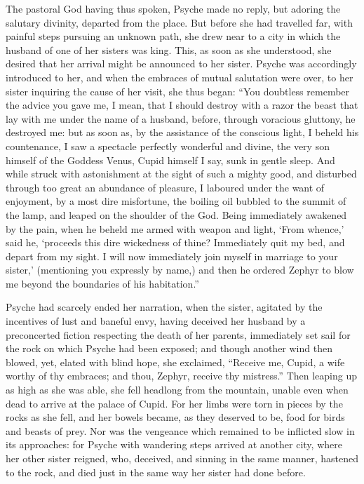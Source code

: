 \documentclass{article}
\begin{document}
The pastoral God having thus spoken, Psyche made no reply, but adoring the
salutary divinity, departed from the place. But before she had travelled far,
with painful steps pursuing an unknown path, she drew near to a city in which
the husband of one of her sisters was king. This, as soon as she understood,
she desired that her arrival might be announced to her sister. Psyche was
accordingly introduced to her, and when the embraces of mutual salutation were
over, to her sister inquiring the cause of her visit, she thus began: ``You
doubtless remember the advice you gave me, I mean, that I should destroy with a
razor the beast that lay with me under the name of a husband, before, through
voracious gluttony, he destroyed me: but as soon as, by the assistance of the
conscious light, I beheld his countenance, I saw a spectacle perfectly
wonderful and divine, the very son himself of the Goddess Venus, Cupid himself
I say, sunk in gentle sleep. And while struck with astonishment at the sight of
such a mighty good, and disturbed through too great an abundance of pleasure, I
laboured under the want of enjoyment, by a most dire misfortune, the boiling
oil bubbled to the summit of the lamp, and leaped on the shoulder of the God.
Being immediately awakened by the pain, when he beheld me armed with weapon and
light, `From whence,' said he, `proceeds this dire wickedness of thine?
Immediately quit my bed, and depart from my sight. I will now immediately join
myself in marriage to your sister,' (mentioning you expressly by name,) and
then he ordered Zephyr to blow me beyond the boundaries of his habitation.''

Psyche had scarcely ended her narration, when the sister, agitated by the
incentives of lust and baneful envy, having deceived her husband by a
preconcerted fiction respecting the death of her parents, immediately set sail
for the rock on which Psyche had been exposed; and though another wind then
blowed, yet, elated with blind hope, she exclaimed, ``Receive me, Cupid, a wife
worthy of thy embraces; and thou, Zephyr, receive thy mistress.'' Then leaping
up as high as she was able, she fell headlong from the mountain, unable even
when dead to arrive at the palace of Cupid. For her limbs were torn in pieces
by the rocks as she fell, and her bowels became, as they deserved to be, food
for birds and beasts of prey. Nor was the vengeance which remained to be
inflicted slow in its approaches: for Psyche with wandering steps arrived at
another city, where her other sister reigned, who, deceived, and sinning in the
same manner, hastened to the rock, and died just in the same way her sister had
done before.
\end{document}
